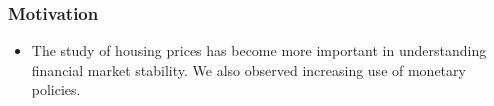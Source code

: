 \documentclass[10pt]{beamer}
\begin{document}
%	
%
%	
%

\begin{frame} 
	\frametitle{Motivation}
	
	
	\begin{itemize}
		\item 	The study of housing prices has become more important in understanding financial market stability. We also observed increasing use of monetary policies.
	\end{itemize}
	
\end{frame}
\end{document}
